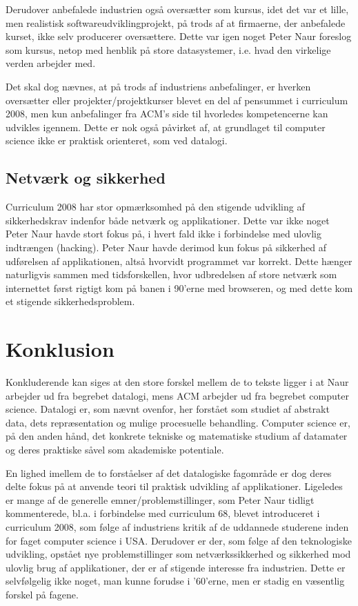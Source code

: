 \documentclass[10pt,a4paper]{article}
\begin{document}
Derudover anbefalede industrien også oversætter som kursus, idet det var et
lille, men realistisk softwareudviklingprojekt, på trods af at firmaerne, der
anbefalede kurset, ikke selv producerer oversættere. Dette var igen noget Peter
Naur foreslog som kursus, netop med henblik på store datasystemer, i.e. hvad den
virkelige verden arbejder med.

Det skal dog nævnes, at på trods af industriens anbefalinger, er hverken
oversætter eller projekter/projektkurser blevet en del af pensummet i curriculum
2008, men kun anbefalinger fra ACM's side til hvorledes kompetencerne kan
udvikles igennem. Dette er nok også påvirket af, at grundlaget til computer
science ikke er praktisk orienteret, som ved datalogi.

\subsection{Netværk og sikkerhed}
Curriculum 2008 har stor opmærksomhed på den stigende udvikling af
sikkerhedskrav indenfor både netværk og applikationer. Dette var ikke noget
Peter Naur havde stort fokus på, i hvert fald ikke i forbindelse med ulovlig
indtrængen (hacking). Peter Naur havde derimod kun fokus på sikkerhed af
udførelsen af applikationen, altså hvorvidt programmet var korrekt. Dette hænger
naturligvis sammen med tidsforskellen, hvor udbredelsen af store netværk som
internettet først rigtigt kom på banen i 90'erne med browseren, og med dette kom
et stigende sikkerhedsproblem.

\section{Konklusion}
Konkluderende kan siges at den store forskel mellem de to tekste ligger i at
Naur arbejder ud fra begrebet datalogi, mens ACM arbejder ud fra begrebet
computer science. Datalogi er, som nævnt ovenfor, her forstået som studiet
af abstrakt data, dets repræsentation og mulige procesuelle behandling. 
Computer science er, på den anden hånd, det konkrete tekniske og matematiske
studium af datamater og deres praktiske såvel som akademiske potentiale. 

En lighed imellem de to forståelser af det datalogiske fagområde er dog deres
delte fokus på at anvende teori til praktisk udvikling af applikationer. Ligeledes
er mange af de generelle emner/problemstillinger, som Peter Naur tidligt
kommenterede, bl.a. i forbindelse med curriculum 68, blevet introduceret
i curriculum 2008, som følge af industriens kritik af de uddannede studerene
inden for faget computer science i USA.
Derudover er der, som følge af den teknologiske udvikling, opstået nye
problemstillinger som netværkssikkerhed og sikkerhed mod ulovlig brug af
applikationer, der er af stigende interesse fra industrien. Dette er
selvfølgelig ikke noget, man kunne forudse i '60'erne, men er stadig en
væsentlig forskel på fagene.
\end{document}
